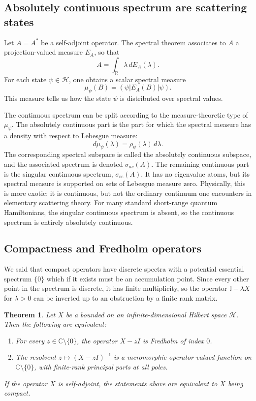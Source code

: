 \documentclass[JHEP,12pt]{article}
\newtheorem{theorem}[lemma]{Theorem}
\begin{document}
\subsection{Absolutely continuous spectrum are scattering states}

Let \(A=A^\ast\) be a self-adjoint operator. The spectral theorem associates to
\(A\) a projection-valued measure \(E_A\), so that
\[
A=\int_{\mathbb R}\lambda\,dE_A(\lambda).
\]
For each state \(\psi\in\mathcal H\), one obtains a scalar spectral measure
\[
\mu_\psi(B)=(\psi|E_A(B)|\psi).
\]
This measure tells us how the state \(\psi\) is distributed over spectral
values.

The continuous spectrum can be split according to the measure-theoretic type of
\(\mu_\psi\). The absolutely continuous part is the part for which the spectral
measure has a density with respect to Lebesgue measure:
\[
d\mu_\psi(\lambda)=\rho_\psi(\lambda)\,d\lambda .
\]
The corresponding spectral subspace is called the absolutely continuous
subspace, and the associated spectrum is denoted $\sigma_{ac}(A)$. The remaining continuous part is the singular continuous spectrum,
$\sigma_{\mathrm{sc}}(A)$.
It has no eigenvalue atoms, but its spectral measure is supported on sets of
Lebesgue measure zero. Physically, this is more exotic: it is continuous, but
not the ordinary continuum one encounters in elementary scattering theory. For many standard short-range quantum Hamiltonians, the singular continuous
spectrum is absent, so the continuous spectrum is entirely absolutely
continuous.


\subsection{Compactness and Fredholm operators}

We said that compact operators have discrete spectra with a potential essential spectrum $\{0\}$ which if it exists must be an accumulation point. Since every other point in the spectrum is discrete, it has finite multiplicity, so the operator $\mathbb{I}-\lambda X$ for $\lambda>0$ can be inverted up to an obstruction by a finite rank matrix.

\begin{theorem}\label{xmImermorphy}
Let $X$ be a bounded on an infinite-dimensional
Hilbert space \(\mathcal H\). Then the following are equivalent:
\begin{enumerate}
\item For every \(z\in\mathbb C\setminus\{0\}\), the operator
$X-zI$
is Fredholm of index \(0\).
\item The resolvent
$z\mapsto (X-zI)^{-1}$
is a meromorphic operator-valued function on $
\mathbb C\setminus\{0\}$, with finite-rank principal parts at all poles.
\end{enumerate}
If the operator $X$ is self-adjoint, the statements above are equivalent to $X$ being compact.
\end{theorem}
\end{document}
